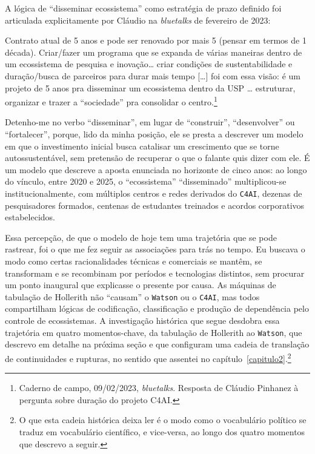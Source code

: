 A lógica de \enquote{disseminar ecossistema} como estratégia de prazo definido foi articulada explicitamente por Cláudio na \textit{bluetalks} de fevereiro de 2023:

\begin{citacaoabnt}
Contrato atual de 5 anos e pode ser renovado por mais 5 (pensar em termos de 1 década). Criar/fazer um programa que se expanda de várias maneiras dentro de um ecossistema de pesquisa e inovação… criar condições de sustentabilidade e duração/busca de parceiros para durar mais tempo […] foi com essa visão: é um projeto de 5 anos pra disseminar um ecossistema dentro da USP … estruturar, organizar e trazer a ``sociedade'' pra consolidar o centro.\footnote{Caderno de campo, 09/02/2023, \textit{bluetalks}. Resposta de Cláudio Pinhanez à pergunta sobre duração do projeto C4AI.}
\end{citacaoabnt}

Detenho-me no verbo \enquote{disseminar}, em lugar de \enquote{construir}, \enquote{desenvolver} ou \enquote{fortalecer}, porque, lido da minha posição, ele se presta a descrever um modelo em que o investimento inicial busca catalisar um crescimento que se torne autossustentável, sem pretensão de recuperar o que o falante quis dizer com ele. É um modelo que descreve a aposta enunciada no horizonte de cinco anos: ao longo do vínculo, entre 2020 e 2025, o \enquote{ecossistema} \enquote{disseminado} multiplicou-se institucionalmente, com múltiplos centros e redes derivados do \texttt{C4AI}, dezenas de pesquisadores formados, centenas de estudantes treinados e acordos corporativos estabelecidos.

Essa percepção, de que o modelo de hoje tem uma trajetória que se pode rastrear, foi o que me fez seguir as associações para trás no tempo. Eu buscava o modo como certas racionalidades técnicas e comerciais se mantêm, se transformam e se recombinam por períodos e tecnologias distintos, sem procurar um ponto inaugural que explicasse o presente por causa. As máquinas de tabulação de Hollerith não \enquote{causam} o \texttt{Watson} ou o \texttt{C4AI}, mas todos compartilham lógicas de codificação, classificação e produção de dependência pelo controle de ecossistemas. A investigação histórica que segue desdobra essa trajetória em quatro momentos-chave, da tabulação de Hollerith ao \texttt{Watson}, que descrevo em detalhe na próxima seção e que configuram uma cadeia de translação de continuidades e rupturas, no sentido que assentei no capítulo~\ref{capitulo2}.\footnote{O que esta cadeia histórica deixa ler é o modo como o vocabulário político se traduz em vocabulário científico, e vice-versa, ao longo dos quatro momentos que descrevo a seguir.}

